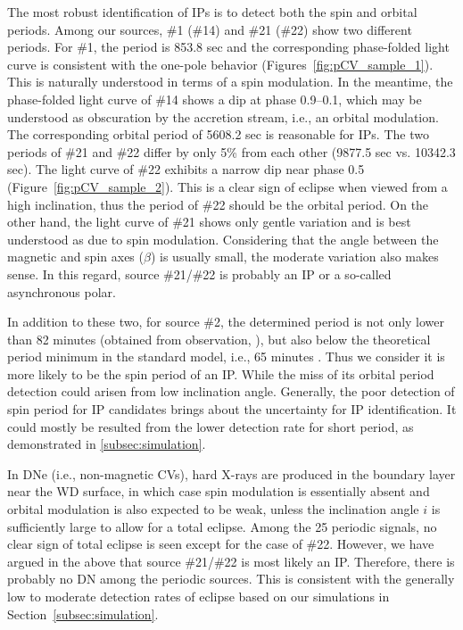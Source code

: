 \documentclass[fleqn,usenatbib]{mnras}
\begin{document}
The most robust identification of IPs is to detect both the spin and orbital periods. Among our sources, \#1 (\#14) and \#21 (\#22) show two different periods.
For \#1, the period is 853.8 sec and the corresponding phase-folded light curve is consistent with the one-pole behavior (Figures~\ref{fig:pCV_sample_1}). This is naturally understood in terms of a spin modulation. 
In the meantime, the phase-folded light curve of \#14 shows a dip at phase 0.9--0.1, which may be understood as obscuration by the accretion stream, i.e., an orbital modulation. The corresponding orbital period of 5608.2 sec is reasonable for IPs. 
The two periods of \#21 and \#22 differ by only 5\% from each other (9877.5 sec vs. 10342.3 sec).
The light curve of \#22 exhibits a narrow dip near phase 0.5 (Figure~\ref{fig:pCV_sample_2}). This is a clear sign of eclipse when viewed from a high inclination, thus the period of \#22 should be the orbital period. 
On the other hand, the light curve of \#21 shows only gentle variation and is best understood as due to spin modulation. 
Considering that the angle between the magnetic and spin axes ($\beta$) is usually small, the moderate variation also makes sense.
In this regard, source \#21/\#22 is probably an IP or a so-called asynchronous polar. 

In addition to these two, for source \#2, the determined period is not only lower than 82 minutes (obtained from observation, \citet{2009MNRAS.397.2170G}), but also below the theoretical period minimum in the standard model, i.e., 65 minutes \citep{2011ApJS..194...28K}. Thus we consider it is more likely to be the spin period of an IP. While the miss of its orbital period detection could arisen from low inclination angle. 
Generally, the poor detection of spin period for IP candidates brings about the uncertainty for IP identification. It could mostly be resulted from the lower detection rate for short period, as demonstrated in \ref{subsec:simulation}.

In DNe (i.e., non-magnetic CVs), hard X-rays are produced in the boundary layer near the WD surface, in which case spin modulation is essentially absent and orbital modulation is also expected to be weak, unless the inclination angle $i$ is sufficiently large to allow for a total eclipse. Among the 25 periodic signals, no clear sign of total eclipse is seen except for the case of \#22. However, we have argued in the above that source \#21/\#22 is most likely an IP. Therefore, there is probably no DN among the periodic sources. This is consistent with the generally low to moderate detection rates of eclipse based on our simulations in Section~\ref{subsec:simulation}. 
\end{document}
